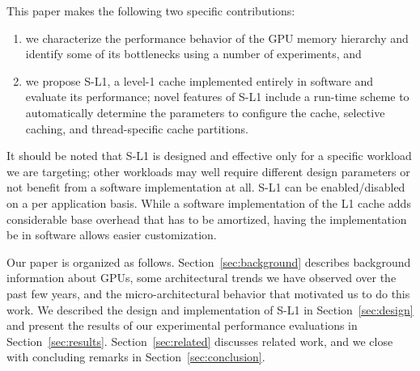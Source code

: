 This paper makes the following two specific contributions:
\begin{enumerate}
\item we characterize the performance behavior of the GPU memory hierarchy and identify some of its bottlenecks using a number of experiments, and
\item we propose S-L1, a level-1 cache implemented entirely in software and evaluate its performance; novel features of S-L1 include a run-time scheme to automatically determine the parameters to configure the cache, selective caching, and thread-specific cache partitions.
\end{enumerate}

It should be noted that S-L1 is designed and effective only for a specific workload we are targeting; other workloads may well require different design parameters or not benefit from a software implementation at all.
S-L1 can be enabled/disabled on a per application basis.
While a software implementation of the L1 cache adds considerable base overhead that has to be amortized, having the implementation be in software allows easier customization.

Our paper is organized as follows. 
Section~\ref{sec:background} describes background information about GPUs, some architectural trends we have observed over the past few years, and the micro-architectural behavior that motivated us to do this work. 
We described the design and implementation of S-L1 in Section~\ref{sec:design} and present the results of our experimental performance evaluations in Section~\ref{sec:results}.  
Section~\ref{sec:related} discusses related work, and we close with concluding remarks in 
Section~\ref{sec:conclusion}.





